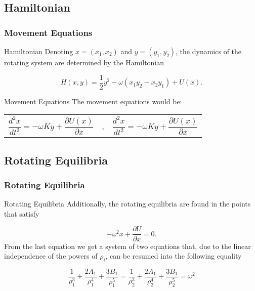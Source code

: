 \documentclass{beamer}
\begin{document}
	\subsection{Hamiltonian}
	\begin{frame}
	\frametitle{Movement Equations}
	\begin{block}{Hamiltonian}
	Denoting $x=(x_1,x_2)$ and $y=(y_1,y_2)$, the dynamics of the rotating system are determined by the Hamiltonian
	
	
$$	H(x,y)=\frac{1}{2}y^2-\omega (x_1y_2-x_2y_1)+U(x).$$
	
	\end{block}
	
	\begin{block}{Movement Equations}
	The movement equations would be:
	\begin{center}
	\begin{tabular}{ccc}
$	\dfrac{d^2 x}{dt^2}=-\omega Ky+\dfrac{\partial U(x)}{\partial x}$
	
&,&	
$	\dfrac{d^2 x}{dt^2}=-\omega Ky+\dfrac{\partial U(x)}{\partial x}$
	\end{tabular}
	\end{center}
	\end{block}
	\end{frame}
	
	\subsection{Rotating Equilibria}
	\begin{frame}
	\frametitle{Rotating Equilibria}
	
	\begin{block}{Rotating Equilibria}
	Additionally, the rotating equilibria are found in the points that satisfy\cite{Meyer}
	
	\begin{equation}\label{rotatingEquilibria}
	-\omega^2 x+\dfrac{\partial U}{\partial x}=0.
	\end{equation}
	From the last equation we get a system of two equations that, due to the linear independence of the powers of $\rho_i$, can be resumed into the following equality
	
	\begin{equation}
	\frac{1}{\rho_1^3}+\frac{2A_1}{\rho_1^4}+\frac{3B_1}{\rho_1^5}=	\frac{1}{\rho_2^3}+\frac{2A_1}{\rho_2^4}+\frac{3B_1}{\rho_2^5}=\omega^2
	\end{equation}
	\end{block}
	\end{frame}
	
\end{document}
